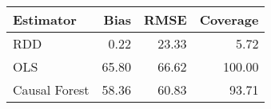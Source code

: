 \begin{table}[ht]
\centering
\begin{tabular}{lrrr}
  \hline
Estimator & Bias & RMSE & Coverage \\ 
  \hline
RDD & 0.22 & 23.33 & 5.72 \\ 
  OLS & 65.80 & 66.62 & 100.00 \\ 
  Causal Forest & 58.36 & 60.83 & 93.71 \\ 
   \hline
\end{tabular}
\end{table}
